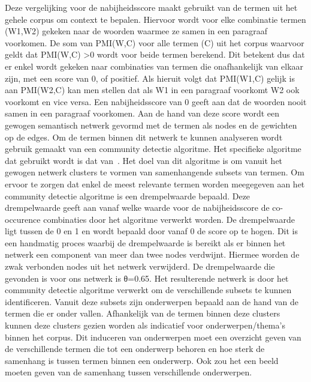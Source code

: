 Deze vergelijking voor de nabijheidsscore maakt gebruikt van de termen uit het gehele corpus om context te bepalen. Hiervoor wordt voor elke combinatie termen (W1,W2) gekeken naar de woorden waarmee ze samen in een paragraaf voorkomen. De som van PMI(W,C) voor alle termen (C) uit het corpus waarvoor geldt dat PMI(W,C) \textgreater 0 wordt voor beide termen berekend. Dit betekent dus dat er enkel wordt gekeken naar combinaties van termen die onafhankelijk van elkaar zijn, met een score van 0, of  positief. Als hieruit volgt dat PMI(W1,C) gelijk is aan PMI(W2,C) kan men stellen dat als W1 in een paragraaf voorkomt W2 ook voorkomt en vice versa. Een nabijheidsscore van 0 geeft aan dat de woorden nooit samen in een paragraaf voorkomen. Aan de hand van deze score wordt een gewogen semantisch netwerk gevormd met de termen als nodes en de gewichten op de edges. Om de termen binnen dit netwerk te kunnen analyseren wordt gebruik gemaakt van een community detectie algoritme. Het specifieke algoritme dat gebruikt wordt is dat van~\cite{blondel2008fast}. Het doel van dit algoritme is om vanuit het gewogen netwerk clusters te vormen van samenhangende subsets van termen. Om ervoor te zorgen dat enkel de meest relevante termen worden meegegeven aan het community detectie algoritme is een drempelwaarde bepaald. Deze drempelwaarde geeft aan vanaf welke waarde voor de nabijheidsscore de co-occurence combinaties door het algoritme verwerkt worden. De drempelwaarde ligt tussen de 0 en 1 en wordt bepaald door vanaf 0 de score op te hogen. Dit is een handmatig proces waarbij de drempelwaarde is bereikt als er binnen het netwerk een component van meer dan twee nodes verdwijnt. Hiermee worden de zwak verbonden nodes uit het netwerk verwijderd. De drempelwaarde die gevonden is voor ons netwerk is θ=0.65. Het resulterende netwerk is door het community detectie algoritme verwerkt om de verschillende subsets te kunnen identificeren. Vanuit deze subsets zijn onderwerpen bepaald aan de hand van de termen die er onder vallen. Afhankelijk van de termen binnen deze clusters kunnen deze clusters gezien worden als indicatief voor onderwerpen/thema's binnen het corpus. Dit induceren van onderwerpen moet een overzicht geven van de verschillende termen die tot een onderwerp behoren en hoe sterk de samenhang is tussen termen binnen een onderwerp. Ook zou het een beeld moeten geven van de samenhang tussen verschillende onderwerpen. 
